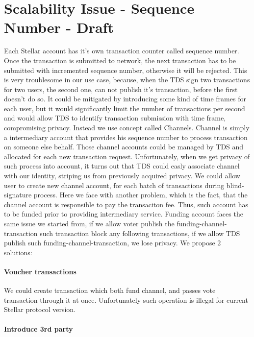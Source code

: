 \documentclass[runningheads]{llncs}
\begin{document}
\section{Scalability Issue - Sequence Number - Draft}
Each Stellar account has it's own transaction counter called sequence number. Once the transaction is submitted to network, the next transaction has to be submitted with incremented sequence number, otherwise it will be rejected. This is very troublesome in our use case, because, when the TDS sign two transactions for two users, the second one, can not publish it's transaction, before the first doesn't do so. It could be mitigated by introducing some kind of time frames for each user, but it would significantly limit the number of transactions per second and would allow TDS to identify transaction submission with time frame, compromising privacy.
Instead we use concept called Channels. Channel is simply a intermediary account that provides his sequence number to process transaction on someone else behalf. Those channel accounts could be managed by TDS and allocated for each new transaction request. Unfortunately, when we get privacy of such process into account, it turns out that TDS could easly associate channel with our identity, striping us from previously acquired privacy. 
We could allow user to create new channel account, for each batch of transactions during blind-signature process. Here we face with another problem, which is the fact, that the channel account is responsible to pay the transaciton fee. Thus, such account has to be funded prior to providing intermediary service. Funding account faces the same issue we started from, if we allow voter publish the funding-channel-transaction such transaction block any following transactions, if we allow TDS publish such funding-channel-transaction, we lose privacy. We propose 2 solutions:

\paragraph{Voucher transactions}
We could create transaction which both fund channel, and passes vote transaction through it at once. Unfortunately such operation is illegal for current Stellar protocol version.

\paragraph{Introduce 3rd party}
\end{document}
